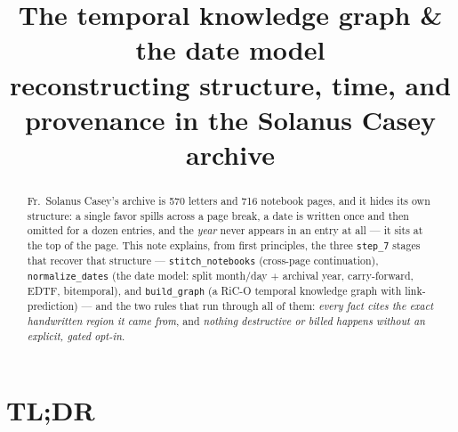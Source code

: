 \documentclass[11pt]{article}
\title{The temporal knowledge graph \& the date model\\[2pt]
       \large reconstructing structure, time, and provenance in the Solanus Casey archive}
\author{}
\date{}
\newcommand{\code}[1]{\texttt{\small #1}}
\begin{document}
\maketitle

\begin{abstract}
\noindent
Fr.\ Solanus Casey's archive is 570 letters and 716 notebook pages, and it hides its own structure: a
single favor spills across a page break, a date is written once and then omitted for a dozen entries,
and the \emph{year} never appears in an entry at all --- it sits at the top of the page. This note
explains, from first principles, the three \code{step\_7} stages that recover that structure ---
\code{stitch\_notebooks} (cross-page continuation), \code{normalize\_dates} (the date model: split
month/day $+$ archival year, carry-forward, EDTF, bitemporal), and \code{build\_graph} (a RiC-O
temporal knowledge graph with link-prediction) --- and the two rules that run through all of them:
\emph{every fact cites the exact handwritten region it came from}, and \emph{nothing destructive or
billed happens without an explicit, gated opt-in}.
\end{abstract}

\tableofcontents
\bigskip

\section{TL;DR}
\end{document}
